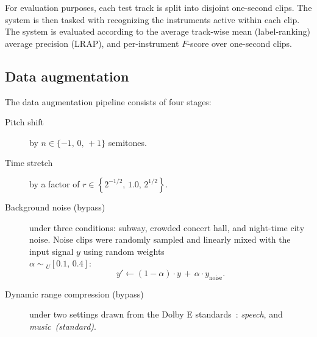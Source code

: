 \documentclass{article}
\begin{document}
For evaluation purposes, each test track is split into disjoint one-second clips.
The system is then tasked with recognizing the instruments active within each clip.
The system is evaluated according to the average track-wise mean (label-ranking) average
precision (LRAP), and per-instrument $F$-score over one-second clips.

\subsection{Data augmentation}

The data augmentation pipeline consists of four stages:

\begin{description}
    \item[Pitch shift] by $n \in \{-1,\, 0,\, +1\}$ semitones.
    \item[Time stretch] by a factor of $r \in \left\{ 2^{-1/2},\, 1.0,\, 2^{1/2}\right\}$.
    \item[Background noise (bypass)] under three conditions:
        subway,%
        crowded concert hall,%
        and night-time city noise. %
        Noise clips were randomly sampled and linearly mixed with the input signal $y$ using random 
        weights\\ ${\alpha \sim {}_U[0.1,\, 0.4]}$:
        \[
            y' \leftarrow (1-\alpha) \cdot y \,+ \, \alpha \cdot y_\text{noise}.
        \]
    \item[Dynamic range compression (bypass)] under two settings drawn from the {Dolby E}
        standards~\cite{dolbyE}: \emph{speech},
        and \emph{music~(standard)}.
\end{description}
\end{document}

